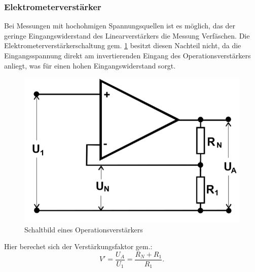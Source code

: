 \subsubsection{Elektrometerverst{\"a}rker}
Bei Messungen mit hochohmigen Spannungsquellen ist es möglich, das der geringe Eingangswiderstand des Linearverstärkers die Messung Verfäschen. Die
Elektrometerverstärkerschaltung gem. \ref{abb:elektro} besitzt diesen Nachteil nicht, da die Eingangsspannung direkt am invertierenden Eingang des Operationsverstärkers anliegt, was für einen hohen Eingangswiderstand
sorgt.
\begin{figure}
 	\centering
 	\includegraphics[width=\textwidth]{img/elec.png}
 	\caption{Schaltbild eines Operationsverstärkers \cite{FP}}
 	\label{abb:elektro}
\end{figure}
Hier berechet sich der Verstärkungsfaktor gem.:
\begin{equation}
V' = \frac{U_A}{U_1}=\frac{R_N + R_1}{R_1}.
\end{equation}


